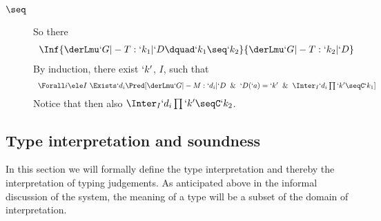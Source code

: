 \documentclass{lmcs}
\begin{document}
\begin{Proof}
\begin{itemize}
\begin{description}
 \item[$\seq$]
So there 
 \[ \begin{array}{c}
\Inf	{\InfBox{ \derLmu `G |- T : `k_1 | `D } \dquad \InfBox{ `k_1 \seq `k_2 }
	}{\derLmu `G |- T : `k_2 | `D }
 \end{array} \]
By induction, there exist $`k'$, $I$, such that
 \[ \begin{array}{c}
\Forall i \ele I ~ \Exists `d_i \Pred[ \derLmuInt `G |- M : `d_i | `D \And `D(`a) = `k' \And \Inter_I `d_i\prod `k' \seqC `k_1 ] 
 \end{array} \]
Notice that then also $ \Inter_I `d_i\prod `k' \seqC `k_2 $. 

 \end{description}

\end{itemize}
 \end{Proof}
 
 
%


 \subsection{Type interpretation and soundness} \label{subsec:typeInterpretation}

In this section we will formally define the type interpretation and thereby the interpretation of typing judgements. 
As anticipated above in the informal discussion of the system, the meaning of a type will be a subset of the domain of interpretation. 
\end{document}
